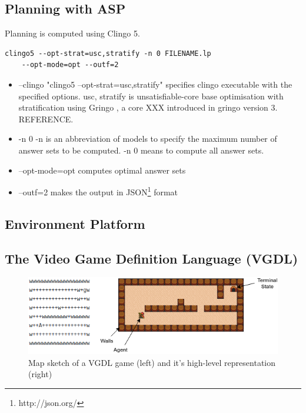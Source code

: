 \subsection{Planning with ASP}
Planning is computed using Clingo 5.

\begin{lstlisting}[]
    clingo5 --opt-strat=usc,stratify -n 0 FILENAME.lp
    --opt-mode=opt --outf=2
\end{lstlisting}

\begin{itemize}
\item \textsf{--clingo "clingo5 --opt-strat=usc,stratify"} specifies clingo executable with the specified options. 
\textsf{usc, stratify} is unsatisfiable-core base optimisation with stratification using Gringo \cite{gringo}, a core XXX introduced in gringo version 3. REFERENCE.
\item \textsf{-n 0} -n is an abbreviation of \textsf{models} to specify the maximum number of answer sets to be computed. \textsf{-n 0} means to compute all answer sets.
\item \textsf{--opt-mode=opt} computes optimal answer sets
\item \textsf{--outf=2} makes the output in JSON\footnote{http://json.org/} format
\end{itemize}

\subsection{Environment Platform}
\subsection{The Video Game Definition Language (VGDL)}

\begin{figure}[!ht!b]
\centering
\includegraphics[width=1\textwidth]{./figures/env_sample}
\caption{Map sketch of a VGDL game (left) and it's high-level representation (right)} 
\label{VGDL_sample}
\end{figure}

